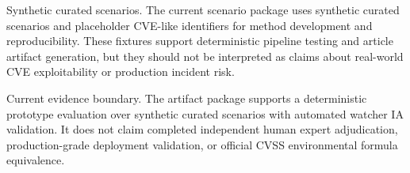 Synthetic curated scenarios. The current scenario package uses synthetic curated scenarios and placeholder CVE-like identifiers for method development and reproducibility. These fixtures support deterministic pipeline testing and article artifact generation, but they should not be interpreted as claims about real-world CVE exploitability or production incident risk.


Current evidence boundary. The artifact package supports a deterministic prototype evaluation over synthetic curated scenarios with automated watcher IA validation. It does not claim completed independent human expert adjudication, production-grade deployment validation, or official CVSS environmental formula equivalence.


